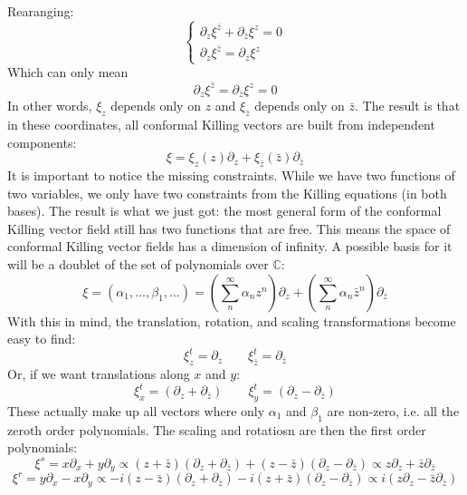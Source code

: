 \documentclass{article}
\begin{document}
Rearanging:
\begin{equation}
\begin{cases}
    \partial_z \xi^{\bar{z}} + \partial_{\bar{z}} \xi^z = 0
    \\
    \partial_z \xi^{\bar{z}} = \partial_{\bar{z}} \xi^z
\end{cases}
\end{equation}
Which can only mean
\begin{equation}
    \partial_z \xi^{\bar{z}} = \partial_{\bar{z}} \xi^z = 0
\end{equation}
In other words, $\xi_z$ depends only on $z$ and $\xi_{\bar{z}}$ depends only on
$\bar{z}$. The result is that in these coordinates, all conformal Killing vectors are built from independent components:
\begin{equation}
    \xi = \xi_z(z)\partial_z + \xi_{\bar{z}}({\bar{z}})\partial_{\bar{z}}
\end{equation}
It is important to notice the missing constraints. While we have two functions of two variables, we only have two constraints from the Killing equations (in both bases). The result is what we just got: the most general form of the conformal Killing vector field still has two functions that are free. This means the space of conformal Killing vector fields has a dimension of infinity. A possible basis for it will be a doublet of the set of polynomials over $\mathbb{C}$:
\begin{equation}
    \xi = (\alpha_1,\dots,\beta_1,\dots) = \left(\sum_n^\infty \alpha_n z^n\right)\partial_z + \left(\sum_n^\infty \alpha_n \bar{z}^n\right)\partial_{\bar{z}}
\end{equation}
With this in mind, the translation, rotation, and scaling transformations become easy to find:
\begin{equation}
    \xi^{t}_z = \partial_z \qquad \xi^{t}_{\bar{z}} = \partial_{\bar{z}}
\end{equation}
Or, if we want translations along $x$ and $y$:
\begin{equation}
    \xi^{t}_x = \left(\partial_z + \partial_{\bar{z}}\right) \qquad
    \xi^{t}_y = \left(\partial_z - \partial_{\bar{z}}\right)
\end{equation}
These actually make up all vectors where only $\alpha_1$ and $\beta_1$ are non-zero, i.e. all the zeroth order polynomials.
The scaling and rotatiosn are then the first order polynomials:
\begin{equation}
    \xi^s = x\partial_x + y\partial_y \propto \left(z + \bar{z}\right)\left(\partial_z + \partial_{\bar{z}}\right) + \left(z - \bar{z}\right)\left(\partial_z - \partial_{\bar{z}}\right) \propto z\partial_z + \bar{z}\partial_{\bar{z}}
\end{equation}
\begin{equation}
    \xi^r = y\partial_x - x\partial_y \propto -i(z - \bar{z})(\partial_z + \partial_{\bar{z}}) - i(z + \bar{z})(\partial_z - \partial_{\bar{z}}) \propto i\left(
        z\partial_z - \bar{z}\partial_{\bar{z}}
    \right)
\end{equation}
\end{document}
